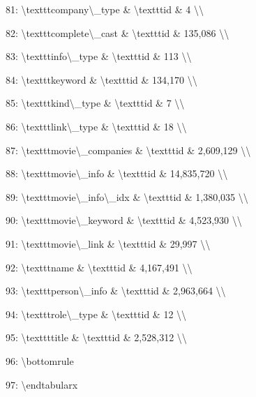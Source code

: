 \documentclass[11pt,a4paper]{article}
\begin{document}
{81: \textbackslash{}texttt{company\textbackslash{}\_type} \& \textbackslash{}texttt{id} \& 4 \textbackslash{}\textbackslash{}

82: \textbackslash{}texttt{complete\textbackslash{}\_cast} \& \textbackslash{}texttt{id} \& 135,086 \textbackslash{}\textbackslash{}

83: \textbackslash{}texttt{info\textbackslash{}\_type} \& \textbackslash{}texttt{id} \& 113 \textbackslash{}\textbackslash{}

84: \textbackslash{}texttt{keyword} \& \textbackslash{}texttt{id} \& 134,170 \textbackslash{}\textbackslash{}

85: \textbackslash{}texttt{kind\textbackslash{}\_type} \& \textbackslash{}texttt{id} \& 7 \textbackslash{}\textbackslash{}

86: \textbackslash{}texttt{link\textbackslash{}\_type} \& \textbackslash{}texttt{id} \& 18 \textbackslash{}\textbackslash{}

87: \textbackslash{}texttt{movie\textbackslash{}\_companies} \& \textbackslash{}texttt{id} \& 2,609,129 \textbackslash{}\textbackslash{}

88: \textbackslash{}texttt{movie\textbackslash{}\_info} \& \textbackslash{}texttt{id} \& 14,835,720 \textbackslash{}\textbackslash{}

89: \textbackslash{}texttt{movie\textbackslash{}\_info\textbackslash{}\_idx} \& \textbackslash{}texttt{id} \& 1,380,035 \textbackslash{}\textbackslash{}

90: \textbackslash{}texttt{movie\textbackslash{}\_keyword} \& \textbackslash{}texttt{id} \& 4,523,930 \textbackslash{}\textbackslash{}

91: \textbackslash{}texttt{movie\textbackslash{}\_link} \& \textbackslash{}texttt{id} \& 29,997 \textbackslash{}\textbackslash{}

92: \textbackslash{}texttt{name} \& \textbackslash{}texttt{id} \& 4,167,491 \textbackslash{}\textbackslash{}

93: \textbackslash{}texttt{person\textbackslash{}\_info} \& \textbackslash{}texttt{id} \& 2,963,664 \textbackslash{}\textbackslash{}

94: \textbackslash{}texttt{role\textbackslash{}\_type} \& \textbackslash{}texttt{id} \& 12 \textbackslash{}\textbackslash{}

95: \textbackslash{}texttt{title} \& \textbackslash{}texttt{id} \& 2,528,312 \textbackslash{}\textbackslash{}

96: \textbackslash{}bottomrule

97: \textbackslash{}end{tabularx}

}
\end{document}
